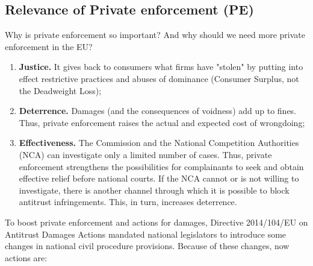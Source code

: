     \subsection{Relevance of Private enforcement (PE)}

        \noindent Why is private enforcement so important? And why should we need more private enforcement in the EU?

        \begin{enumerate}
            \item \textbf{Justice.} It gives back to consumers what firms have "stolen" by putting into effect restrictive practices and abuses of dominance (Consumer Surplus, not the Deadweight Loss);
            \item \textbf{Deterrence.} Damages (and the consequences of voidness) add up to fines. Thus, private enforcement raises the actual and expected cost of wrongdoing;
            \item \textbf{Effectiveness.} The Commission and the National Competition Authorities (NCA) can investigate only a limited number of cases. Thus, private enforcement strengthens the possibilities for complainants to seek and obtain effective relief before national courts. If the NCA cannot or is not willing to investigate, there is another channel through which it is possible to block antitrust infringements. This, in turn, increases deterrence.
        \end{enumerate}

        To boost private enforcement and actions for damages, Directive 2014/104/EU on Antitrust Damages Actions mandated national legislators to introduce some changes in national civil procedure provisions. Because of these changes, now actions are:

